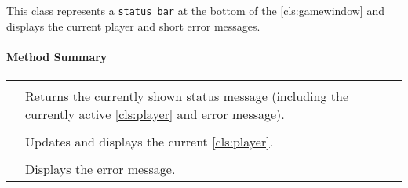 This class represents a \texttt{status bar} at the bottom of the \ref{cls:gamewindow} and displays the current player and short error messages. \\

\centerdash

\paragraph*{Method Summary}
\paragraph*{}
\begin{longtable}{Lp{10cm}}
	\startmethodtable
	 \\
	& Returns the currently shown status message (including the currently active \ref{cls:player} and error message). \\
	 \\
	& Updates and displays the current \ref{cls:player}. \\
	 \\
	& Displays the error message. \\ 
	\hline
\end{longtable}
